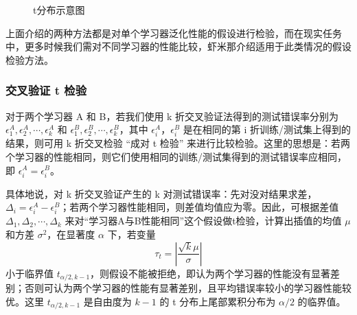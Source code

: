 \begin{figure}[H]
    \centering
    \caption{t分布示意图}
    \label{t分布示意图}
\end{figure}

上面介绍的两种方法都是对单个学习器泛化性能的假设进行检验，而在现实任务中，更多时候我们需对不同学习器的性能比较，虾米那介绍适用于此类情况的假设检验方法。

\subsubsection{交叉验证 t 检验}

对于两个学习器 A 和 B，若我们使用 k 折交叉验证法得到的测试错误率分别为 $\epsilon_{1}^{A},\epsilon_{2}^{A},\cdots,\epsilon_{k}^{A}$ 和 $\epsilon_{1}^{B},\epsilon_{2}^{B},\cdots,\epsilon_{k}^{B}$，其中 $\epsilon_{i}^A，\epsilon_{i}^B$ 是在相同的第 i 折训练/测试集上得到的结果，则可用 k 折交叉检验 ``成对 t 检验'' 来进行比较检验。这里的思想是：若两个学习器的性能相同，则它们使用相同的训练/测试集得到的测试错误率应相同，即 $\epsilon_{i}^A = \epsilon_{i}^B$。

具体地说，对 k 折交叉验证产生的 k 对测试错误率：先对没对结果求差，$\Delta_i = \epsilon_i^A - \epsilon_i^B$；若两个学习器性能相同，则差值均值应为零。因此，可根据差值 $\Delta_1,\Delta_2,\cdots,\Delta_k$ 来对``学习器A与B性能相同''这个假设做t检验，计算出插值的均值 $\mu$ 和方差 $\sigma^2$，在显著度 $\alpha$ 下，若变量
\begin{equation}
    \tau_t = |\frac{\sqrt{k}\mu}{\sigma}|
\end{equation}
小于临界值 $t_{\alpha/2,k-1}$，则假设不能被拒绝，即认为两个学习器的性能没有显著差别；否则可认为两个学习器的性能有显著差别，且平均错误率较小的学习器性能较优。这里 $t_{\alpha/2,k-1}$ 是自由度为 $k-1$ 的 t 分布上尾部累积分布为 $\alpha/2$ 的临界值。

